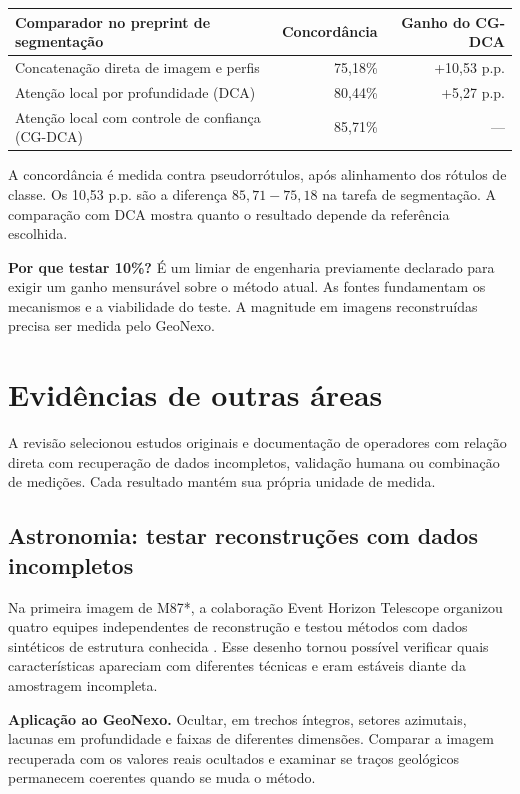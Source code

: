\documentclass[11pt,a4paper]{article}
\newcommand{\callout}[1]{\par\smallskip\noindent\colorbox{paperaccent}{%
  \parbox{\dimexpr\linewidth-2\fboxsep\relax}{\vspace{4pt}\small #1\vspace{4pt}}}\par\smallskip}
\begin{document}
\begin{center}
\small
\begin{tabularx}{\linewidth}{Yrr}
\toprule
\textbf{Comparador no preprint de segmentação} & \textbf{Concordância} & \textbf{Ganho do CG-DCA} \\
\midrule
Concatenação direta de imagem e perfis & 75,18\% & +10,53 p.p. \\
Atenção local por profundidade (DCA) & 80,44\% & +5,27 p.p. \\
Atenção local com controle de confiança (CG-DCA) & 85,71\% & --- \\
\bottomrule
\end{tabularx}
\end{center}

A concordância é medida contra pseudorrótulos, após alinhamento dos rótulos de classe. Os 10,53 p.p. são a diferença $85{,}71-75{,}18$ na tarefa de segmentação. A comparação com DCA mostra quanto o resultado depende da referência escolhida.

\callout{\textbf{Por que testar 10\%?} É um limiar de engenharia previamente declarado para exigir um ganho mensurável sobre o método atual. As fontes fundamentam os mecanismos e a viabilidade do teste. A magnitude em imagens reconstruídas precisa ser medida pelo GeoNexo.}

\newpage
\section{Evidências de outras áreas}

A revisão selecionou estudos originais e documentação de operadores com relação direta com recuperação de dados incompletos, validação humana ou combinação de medições. Cada resultado mantém sua própria unidade de medida.

\subsection{Astronomia: testar reconstruções com dados incompletos}

Na primeira imagem de M87*, a colaboração Event Horizon Telescope organizou quatro equipes independentes de reconstrução e testou métodos com dados sintéticos de estrutura conhecida \cite{eht}. Esse desenho tornou possível verificar quais características apareciam com diferentes técnicas e eram estáveis diante da amostragem incompleta.

\textbf{Aplicação ao GeoNexo.} Ocultar, em trechos íntegros, setores azimutais, lacunas em profundidade e faixas de diferentes dimensões. Comparar a imagem recuperada com os valores reais ocultados e examinar se traços geológicos permanecem coerentes quando se muda o método.
\end{document}
